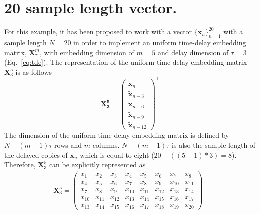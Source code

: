 \section{20 sample length vector.}
For this example, it has been proposed to work with a vector 
$\{ \boldsymbol{x}_n \}_{n=1}^{20}$ with a sample length $N=20$ in order 
to implement an uniform time-delay embedding matrix, 
$\boldsymbol{X}^{m}_{\tau} $, with embedding dimension of $m=5$ 
and delay dimension of $\tau=3$ (Eq.~\eqref{eq:tde}).%
The representation of the uniform time-delay embedding matrix
$\boldsymbol{X}^{5}_{3}$ is as follows
\begin{equation}\label{eq:etde_example}
\boldsymbol{X^5_3} =
\begin{pmatrix}
  \boldsymbol{ \tilde{x} }_n \\
  \boldsymbol{ \tilde{x} }_{n-3} \\
  \boldsymbol{ \tilde{x} }_{n-6} \\
  \boldsymbol{ \tilde{x} }_{n-9} \\
  \boldsymbol{ \tilde{x} }_{n-12}
\end{pmatrix}^\intercal
\end{equation}
The dimension of the uniform time-delay embedding matrix is defined by
$N-(m-1)\tau$ rows and $m$ columns.
$N-(m-1)\tau$ is also the sample length of the delayed copies of 
$\boldsymbol{x}_n$ which is equal to eight ($20-((5-1)*3)=8$).
Therefore, $\boldsymbol{X}^{5}_{3}$ can be explicitly represented as
\begin{equation}\label{eq:etdee1}
\boldsymbol{X}^5_3 =
\begin{pmatrix}
  x_1 & x_2 & x_3 & x_4 & x_5 & x_6 & x_7 & x_8 \\
  x_4 & x_5 & x_6 & x_7 & x_8 & x_9 & x_{10} & x_{11} \\
  x_{7} & x_{8} & x_{9} & x_{10} & x_{11} & x_{12} & x_{13} & x_{14} \\
  x_{10} & x_{11} & x_{12} & x_{13} & x_{14} & x_{15} & x_{16} & x_{17} \\
  x_{13} & x_{14} & x_{15} & x_{16} & x_{17} & x_{18} & x_{19} & x_{20}
\end{pmatrix}^\intercal
\end{equation}

